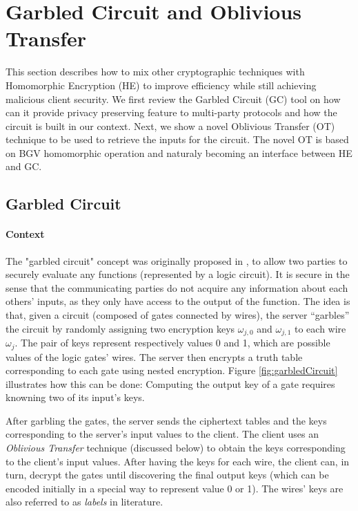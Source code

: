 \section{Garbled Circuit and Oblivious Transfer}
\label{sec:defMPP}

This section describes how to mix other cryptographic techniques with
Homomorphic Encryption (HE) to improve efficiency while still achieving
malicious client security. We first review the Garbled Circuit (GC) tool on how
can it provide privacy preserving feature to multi-party protocols and how the
circuit is built in our context. Next, we show a novel Oblivious Transfer (OT)
technique to be used to retrieve the inputs for the circuit. The novel OT is
based on BGV homomorphic operation and naturaly becoming an interface between HE
and GC.
\subsection{Garbled Circuit}
\label{sec:garbledCircuitPre}

\paragraph{Context}
The "garbled circuit" concept was originally proposed in \cite{yao1986generate}, to
allow two parties to securely evaluate any functions (represented by a logic
circuit). It is secure in the sense that the communicating parties do not acquire
any information about each others' inputs, as they only have access to the output of the
function. The idea is that, given a circuit (composed of gates connected by
wires), the server ``garbles'' the circuit by randomly assigning two encryption
keys \(\omega_{j,0}\) and \(\omega_{j,1}\) to each wire \(\omega_{j}\). The pair
of keys represent respectively values 0 and 1, which are possible values of the
logic gates' wires. The server then encrypts a truth table corresponding to each
gate using nested encryption. Figure \ref{fig:garbledCircuit} illustrates how
this can be done: Computing the output key of a gate requires knowning two of
its input's keys.

After garbling the gates, the server sends the ciphertext tables and the keys corresponding to the server's input values to the client. The client uses an
\textit{Oblivious Transfer } technique (discussed below) to obtain the keys
corresponding to the client's input values. After having the keys for each wire,
the client can, in turn, decrypt the gates until discovering the final output keys
(which can be encoded initially in a special way to represent value 0 or 1). The
wires' keys are also referred to as \textit{labels} in literature.

